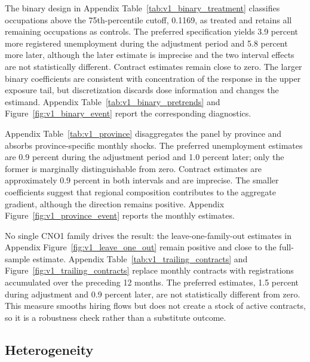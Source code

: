 \documentclass[11pt]{article}
\begin{document}
The binary design in Appendix Table~\ref{tab:v1_binary_treatment} classifies occupations above the 75th-percentile cutoff, 0.1169, as treated and retains all remaining occupations as controls. The preferred specification yields 3.9 percent more registered unemployment during the adjustment period and 5.8 percent more later, although the later estimate is imprecise and the two interval effects are not statistically different. Contract estimates remain close to zero. The larger binary coefficients are consistent with concentration of the response in the upper exposure tail, but discretization discards dose information and changes the estimand. Appendix Table~\ref{tab:v1_binary_pretrends} and Figure~\ref{fig:v1_binary_event} report the corresponding diagnostics.

Appendix Table~\ref{tab:v1_province} disaggregates the panel by province and absorbs province-specific monthly shocks. The preferred unemployment estimates are 0.9 percent during the adjustment period and 1.0 percent later; only the former is marginally distinguishable from zero. Contract estimates are approximately 0.9 percent in both intervals and are imprecise. The smaller coefficients suggest that regional composition contributes to the aggregate gradient, although the direction remains positive. Appendix Figure~\ref{fig:v1_province_event} reports the monthly estimates.

No single CNO1 family drives the result: the leave-one-family-out estimates in Appendix Figure~\ref{fig:v1_leave_one_out} remain positive and close to the full-sample estimate. Appendix Table~\ref{tab:v1_trailing_contracts} and Figure~\ref{fig:v1_trailing_contracts} replace monthly contracts with registrations accumulated over the preceding 12 months. The preferred estimates, 1.5 percent during adjustment and 0.9 percent later, are not statistically different from zero. This measure smooths hiring flows but does not create a stock of active contracts, so it is a robustness check rather than a substitute outcome.

\subsection{Heterogeneity}
\label{sec:v1_heterogeneity}


\end{document}

